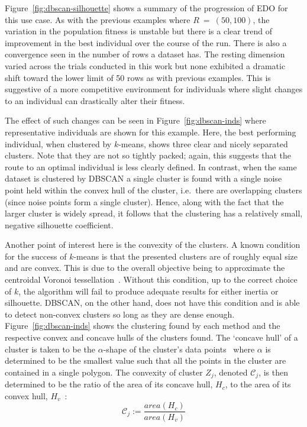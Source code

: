Figure~\ref{fig:dbscan-silhouette} shows a summary of the progression of EDO
for this use case. As with the previous examples where \(R~=~(50, 100)\), the
variation in the population fitness is unstable but there is a clear trend of
improvement in the best individual over the course of the run. There is also a
convergence seen in the number of rows a dataset has. The resting dimension
varied across the trials conducted in this work but none exhibited a dramatic
shift toward the lower limit of 50 rows as with previous examples. This is
suggestive of a more competitive environment for individuals where slight
changes to an individual can drastically alter their fitness.

The effect of such changes can be seen in Figure~\ref{fig:dbscan-inds} where
representative individuals are shown for this example. Here, the best performing
individual, when clustered by \(k\)-means, shows three clear and nicely
separated clusters. Note that they are not so tightly packed; again, this
suggests that the route to an optimal individual is less clearly defined. In
contrast, when the same dataset is clustered by DBSCAN a single cluster is found
with a single noise point held within the convex hull of the cluster, i.e.\
there are overlapping clusters (since noise points form a single cluster).
Hence, along with the fact that the larger cluster is widely spread, it follows
that the clustering has a relatively small, negative silhouette coefficient.

Another point of interest here is the convexity of the clusters. A known
condition for the success of \(k\)-means is that the presented clusters are of
roughly equal size and are convex. This is due to the overall objective being to
approximate the centroidal Voronoi tessellation~\cite{Du2006}. Without this
condition, up to the correct choice of \(k\), the algorithm will fail to produce
adequate results for either inertia or silhouette. DBSCAN, on the other hand,
does not have this condition and is able to detect non-convex clusters so long
as they are dense enough. Figure~\ref{fig:dbscan-inds} shows the clustering
found by each method and the respective convex and concave hulls of the clusters
found. The `concave hull' of a cluster is taken to be the \(\alpha\)-shape of
the cluster's data points~\cite{Edelsbrunner1983} where \(\alpha\) is determined
to be the smallest value such that all the points in the cluster are contained
in a single polygon. The convexity of cluster \(Z_j\), denoted
\(\mathcal{C}_j\), is then determined to be the ratio of the area of its concave
hull, \(H_c\), to the area of its convex hull, \(H_v\)~\cite{Sonka1993}:
\begin{equation}
    \mathcal{C}_j := \frac{area(H_c)}{area(H_v)}
\end{equation}

